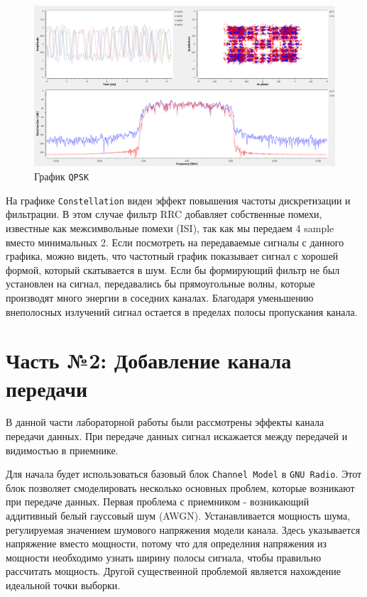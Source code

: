 \documentclass[a4paper]{article}
\begin{document}
            \begin{figure}[H]
                \centering
                \includegraphics[width=\textwidth]{img/p1_2.png}
                \caption{График \texttt{QPSK}}
                \label{fig:p1_2}
            \end{figure}
            
            На графике \texttt{Constellation} виден эффект повышения частоты дискретизации и фильтрации. В этом случае фильтр RRC добавляет собственные помехи, известные как межсимвольные помехи (ISI), так как мы передаем 4 sample вместо минимальных 2. Если посмотреть на передаваемые сигналы с данного графика, можно видеть, что частотный график показывает сигнал с хорошей формой, который скатывается в шум. Если бы формирующий фильтр не был установлен на сигнал, передавались бы прямоугольные волны, которые производят много энергии в соседних каналах. Благодаря уменьшению внеполосных излучений сигнал остается в пределах полосы пропускания канала.
            
    \newpage
        \section{Часть №2: Добавление канала передачи}
        
           В данной части лабораторной работы были рассмотрены эффекты канала передачи данных. При передаче данных сигнал искажается между передачей и видимостью в приемнике. 
           
           Для начала будет использоваться базовый блок \texttt{Channel Model} в \texttt{GNU Radio}. Этот блок позволяет смоделировать несколько основных проблем, которые возникают при передаче данных. Первая проблема с приемником - возникающий аддитивный белый гауссовый шум (AWGN). Устанавливается мощность шума, регулируемая значением шумового напряжения модели канала. Здесь указывается напряжение вместо мощности, потому что для определния напряжения из мощности необходимо узнать ширину полосы сигнала, чтобы правильно рассчитать мощность. Другой существенной проблемой является нахождение идеальной точки выборки.
           
\end{document}
